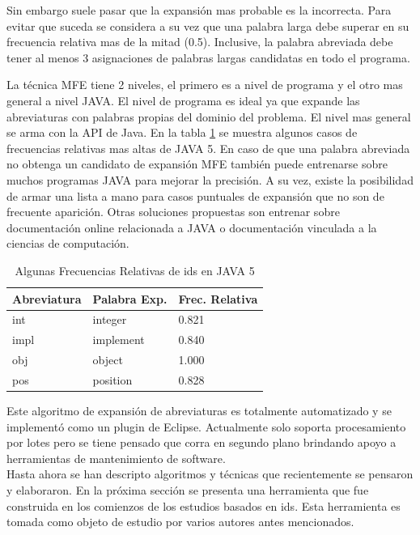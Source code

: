 \documentclass[a4paper,12pt]{report}
\begin{document}
Sin embargo suele pasar que la expansión mas probable es la incorrecta. Para evitar que suceda se considera a su vez que una palabra larga debe superar en su frecuencia relativa mas de la mitad (0.5). Inclusive, la palabra abreviada debe tener al menos 3 asignaciones de palabras largas candidatas en todo el programa.

La técnica MFE tiene 2 niveles, el primero es a nivel de programa y el otro mas general a nivel JAVA. El nivel de programa es ideal ya que expande las abreviaturas con palabras propias del dominio del problema. El nivel mas general se arma con la API de Java. En la tabla \ref{tab_mfe} se muestra algunos casos de frecuencias relativas mas altas de JAVA 5. En caso de que una palabra abreviada no obtenga un candidato de expansión MFE también puede entrenarse sobre muchos programas JAVA para mejorar la precisión. A su vez, existe la posibilidad de armar una lista a mano para casos puntuales de expansión que no son de frecuente aparición. Otras soluciones propuestas son entrenar sobre documentación online relacionada a JAVA o documentación vinculada a la ciencias de computación.

\begin{table}
\begin{center}
   \begin{tabular}{| l |l | l |}
     \hline \textsf{Abreviatura} & \textsf{Palabra Exp.} & \textsf{Frec. Relativa} \\
     \hline \textsf{int} & \textsf{integer} & 0.821 \\
     \hline \textsf{impl} & \textsf{implement} & 0.840 \\
     \hline \textsf{obj} & \textsf{object} & 1.000 \\
     \hline \textsf{pos} & \textsf{position} & 0.828 \\
     \hline	   
   \end{tabular}
   \label{tab_mfe}
\caption{Algunas Frecuencias Relativas de ids en JAVA 5}
\end{center}   
\end {table}


Este algoritmo de expansión de abreviaturas es totalmente automatizado y se implementó como un plugin de Eclipse. Actualmente solo soporta procesamiento por lotes pero se tiene pensado que corra en segundo plano brindando apoyo a herramientas de mantenimiento de software\cite{EZH08}.\\

Hasta ahora se han descripto algoritmos y técnicas que recientemente se pensaron y elaboraron. En la próxima sección se presenta una herramienta que fue construida en los comienzos de los estudios basados en ids. Esta herramienta es tomada como objeto de estudio por varios autores antes mencionados\cite{EZH08,DCHD06,DLHD06,LFBEX07}.
\end{document}

